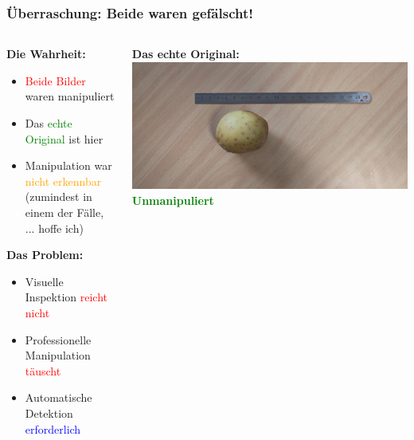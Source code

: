 \documentclass[11pt,t,usepdftitle=false,aspectratio=169]{beamer}
\begin{document}
\begin{frame}
	\frametitle{Überraschung: Beide waren gefälscht!}
	\begin{columns}[T]
		\begin{column}{0.48\textwidth}
			\textbf{Die Wahrheit:}
			\begin{itemize}
				\item \textcolor{red}{Beide Bilder} waren manipuliert
				\item Das \textcolor{green}{echte Original} ist hier
				\item Manipulation war \textcolor{orange}{nicht erkennbar} (zumindest in einem der Fälle, ... hoffe ich)
			\end{itemize}
			
			\vspace{0.5em}
			\textbf{Das Problem:}
			\begin{itemize}
				\item Visuelle Inspektion \textcolor{red}{reicht nicht}
				\item Professionelle Manipulation \textcolor{red}{täuscht}
				\item Automatische Detektion \textcolor{blue}{erforderlich}
			\end{itemize}
		\end{column}
		\begin{column}{0.48\textwidth}
			\centering
			\textbf{Das echte Original:}
			\vspace{0.5em}
			\includegraphics[width=\textwidth]{images/image_2.jpg}
			\vspace{0.5em}
			\textcolor{green}{\textbf{Unmanipuliert}}
		\end{column}
	\end{columns}
\end{frame}
\end{document}
